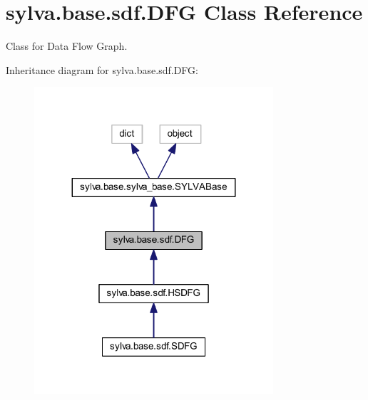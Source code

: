 \hypertarget{classsylva_1_1base_1_1sdf_1_1_d_f_g}{}\section{sylva.\+base.\+sdf.\+D\+FG Class Reference}
\label{classsylva_1_1base_1_1sdf_1_1_d_f_g}


Class for Data Flow Graph.  




Inheritance diagram for sylva.\+base.\+sdf.\+D\+FG\+:\nopagebreak
\begin{figure}[H]
\begin{center}
\leavevmode
\includegraphics[width=251pt]{classsylva_1_1base_1_1sdf_1_1_d_f_g__inherit__graph}
\end{center}
\end{figure}
